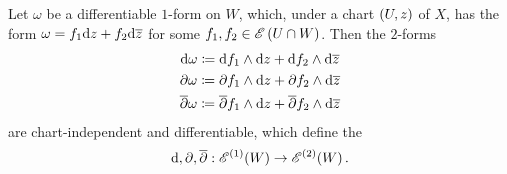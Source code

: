 \documentclass[../Moduli_Spaces_of_Riemann_Surfaces.tex]{subfiles}
\begin{document}
    \begin{defprop}
        Let $\omega$ be a differentiable $1$-form on $W$, which, under a chart $\left(U,z\right)$ of $X$, has the form $\omega=f_1\mathrm{d} z+f_2\mathrm{d}\overline{z}$ for some $f_1,f_2\in\mathscr{E}\left(U\cap W\right)$. Then the $2$-forms
        \begin{equation*}
            \begin{gathered}
                \mathrm{d}\omega\coloneqq\mathrm{d} f_1\wedge\mathrm{d} z+\mathrm{d} f_2\wedge\mathrm{d}\overline{z} \\
                \partial\omega\coloneqq\partial f_1\wedge\mathrm{d} z+\partial f_2\wedge\mathrm{d}\overline{z} \\
                \overline{\partial}\omega\coloneqq\overline{\partial}f_1\wedge\mathrm{d} z+\overline{\partial}f_2\wedge\mathrm{d}\overline{z}
            \end{gathered}
        \end{equation*}
        are chart-independent and differentiable, which define the 
        \begin{equation*}
            \mathrm{d},\partial,\overline{\partial}:\mathscr{E}^{\left(1\right)}\!\left(W\right)\to\mathscr{E}^{\left(2\right)}\!\left(W\right).
        \end{equation*}
    \end{defprop}
\end{document}
